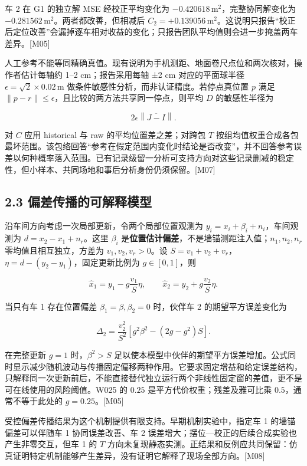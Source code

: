 \documentclass[12pt,a4paper]{article}
\begin{document}
车 2 在 G1 的独立解 MSE 经校正平均变化为
\(-0.420618\,\mathrm m^2\)，完整协同解变化为
\(-0.281562\,\mathrm m^2\)。两者都改善，但相减后
\(C_2=+0.139056\,\mathrm m^2\)。这说明只报告``校正后定位改善''会漏掉逐车相对收益的变化；只报告团队平均值则会进一步掩盖两车差异。{[}M05{]}

人工参考不能等同精确真值。现有说明为手机测距、地面卷尺点位和两次核对，操作者估计每轴约
1--2 cm；报告采用每轴 ±2 cm 对应的平面球半径
\(\epsilon=\sqrt2\times0.02\,\mathrm m\)
做条件敏感性分析，而非认证精度。若停点真位置 \(p\) 满足
\(\|p-r\|\le\epsilon\)，且比较的两方法共享同一停点，则平均 \(D\)
的敏感性半径为

\[2\epsilon\left\|\overline{J-I}\right\|.\]

对 \(C\) 应用 historical 与 raw 的平均位置差之差；对跨包 \(T\)
按组均值权重合成各包最坏范围。该包络回答``参考在假定范围内变化时结论是否改变''，并不回答参考误差以何种概率落入范围。已有记录级留一分析可支持方向对这些记录删减的稳定性，但小样本、共同场地和事后分析身份仍须保留。{[}M07{]}

\subsection{2.3
偏差传播的可解释模型}\label{ux504fux5deeux4f20ux64adux7684ux53efux89e3ux91caux6a21ux578b}

沿车间方向考虑一次局部更新，令两个局部位置观测为
\(y_i=x_i+\beta_i+n_i\)，车间观测为 \(d=x_2-x_1+n_r\)。这里 \(\beta_i\)
是\textbf{位置估计偏差}，不是墙锚测距注入值；\(n_1,n_2,n_r\)
零均值且相互独立，方差为 \(v_1,v_2,v_r>0\)。设
\(S=v_1+v_2+v_r\)，\(\eta=d-(y_2-y_1)\)，固定更新比例为
\(g\in[0,1]\)，则

\[\widehat x_1=y_1-g\frac{v_1}{S}\eta,\qquad
\widehat x_2=y_2+g\frac{v_2}{S}\eta.\]

当只有车 1 存在位置偏差 \(\beta_1=\beta,\beta_2=0\) 时，伙伴车 2
的期望平方误差变化为

\[\Delta_2=\frac{v_2^2}{S^2}\left[g^2\beta^2-(2g-g^2)S\right].\]

在完整更新 \(g=1\) 时，\(\beta^2>S\)
足以使本模型中伙伴的期望平方误差增加。公式同时显示减少随机波动与传播固定偏移两种作用。它要求固定增益和给定误差结构，只解释同一次更新前后，不能直接替代独立运行两个非线性固定窗的差值，更不是可在线使用的风险阈值。W025
的 \(0.25\) 是平方代价权重；残差及雅可比乘 \(0.5\)，通常不等于此处的
\(g=0.25\)。{[}M05{]}

受控偏差传播结果为这个机制提供有限支持。早期机制实验中，指定车 1
的墙锚偏差可以伴随车 1 协同误差改善、车 2
误差增大；摆位---校正的后续合成实验也产生非零交互，但车 1 的 \(T\)
方向未复现静态实测。正结果和反例应共同保留：仿真证明特定机制能够产生差异，没有证明它解释了现场全部方向。{[}M08{]}
\end{document}

